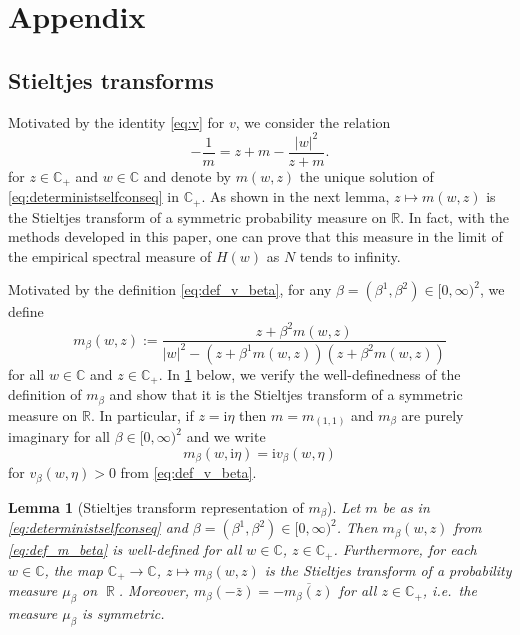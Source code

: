 \documentclass[11pt]{article}
\DeclareMathOperator{\RR}{\mathbb{R}}
\newcommand{\ii}{\mathrm{i}}
\newcommand{\abs}[1]{\left| #1 \right|}
\newcommand{\R}{\mathbb{R}}
\newcommand{\C}{\mathbb{C}}
\theoremstyle{plain}
\newtheorem{lemma}{Lemma}[section]
\theoremstyle{remark}
\numberwithin{equation}{section}
\newcommand*\barr[1]{\overline{#1}}
\begin{document}
	
	\appendix 
	
	
	\section{Appendix} 
	
	\subsection{Stieltjes transforms} 

Motivated by the identity \cref{eq:v} for $v$, we consider the relation 
\begin{equation}\label{eq:deterministselfconseq}
		-\frac{1}{m}= z + m - \frac{|w|^2}{z+m}.
	\end{equation}
	for $z \in \C_+$ and $w \in \C$ and denote by $m(w,z)$ the unique solution of \cref{eq:deterministselfconseq} in $\C_+$.
	As shown in the next lemma, $z\mapsto m(w,z)$ is the Stieltjes transform of a symmetric probability measure on $\R$. In fact, with the methods developed in this paper, one can prove that this measure in the limit of the empirical spectral measure of $H(w)$ as $N$ tends to infinity.
	
	Motivated by the definition \cref{eq:def_v_beta}, for any $\beta = (\beta^1, \beta^2) \in [0,\infty)^2$, we define 
	\begin{equation} \label{eq:def_m_beta}  
		m_\beta(w,z) := \frac{z + \beta^2m(w,z)}{\abs{w}^2 - (z + \beta^1 m(w,z))(z + \beta^2 m(w,z))} 
	\end{equation} 
	for all $w \in \C$ and $z \in \C_+$. 
	In \cref{lem:m_1_Stieltjes} below, we verify the well-definedness of the definition of $m_\beta$ and show that it is the Stieltjes transform of a symmetric measure on $\R$. 
	In particular, if $z = \ii \eta$ then $m=m_{(1,1)}$ and $m_{\beta}$ are purely imaginary  for all $\beta \in [0,\infty)^2$ and we write 
	\begin{equation} \label{eq:v_beta_m_beta} 
		m_{\beta}(w,\ii\eta) = \ii v_{\beta}(w,\eta)
 	\end{equation}
	for $v_{\beta}(w,\eta)>0$ from \eqref{eq:def_v_beta}. 
	
	
	\begin{lemma}[Stieltjes transform representation of $m_\beta$]
		\label{lem:m_1_Stieltjes} 
		Let $m$ be as in \eqref{eq:deterministselfconseq} and $\beta =(\beta^1, \beta^2) \in [0,\infty)^2$. Then $m_\beta(w,z)$ from \eqref{eq:def_m_beta} is well-defined for all $w \in \C$, $z \in \C_+$. Furthermore, for each $w \in \C$, the map $\C_+ \to \C$, $z \mapsto m_\beta(w,z)$ is the Stieltjes transform of a probability measure $\mu_\beta$ on $\RR$. 
		Moreover, $m_\beta(- \bar z) = - \barr{m_\beta(z)}$ for all $z \in \C_+$, i.e.\ the measure $\mu_\beta$ is symmetric. 
	\end{lemma}
	
\end{document}
